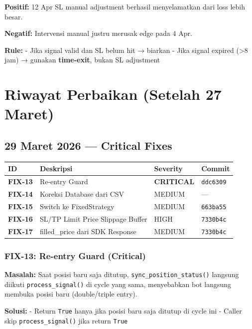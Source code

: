\documentclass[
  11pt,
  a4paper,
]{article}
\newcounter{none} %
\begin{document}
\textbf{Positif:} 12 Apr SL manual adjustment berhasil menyelamatkan
dari loss lebih besar.

\textbf{Negatif:} Intervensi manual justru merusak edge pada 4 Apr.

\textbf{Rule:} - Jika signal valid dan SL belum hit → biarkan - Jika
signal expired (\textgreater8 jam) → gunakan \textbf{time-exit}, bukan
SL adjustment

\section{Riwayat Perbaikan (Setelah 27
Maret)}\label{riwayat-perbaikan-setelah-27-maret}

\subsection{29 Maret 2026 --- Critical
Fixes}\label{maret-2026-critical-fixes}

{\def\LTcaptype{none} %
\begin{longtable}[]{@{}llll@{}}
\toprule\noalign{}
ID & Deskripsi & Severity & Commit \\
\midrule\noalign{}
\endhead
\bottomrule\noalign{}
\endlastfoot
\textbf{FIX-13} & Re-entry Guard & \textbf{CRITICAL} &
\texttt{ddc6309} \\
\textbf{FIX-14} & Koreksi Database dari CSV & MEDIUM & --- \\
\textbf{FIX-15} & Switch ke FixedStrategy & MEDIUM & \texttt{663ba55} \\
\textbf{FIX-16} & SL/TP Limit Price Slippage Buffer & HIGH &
\texttt{7330b4c} \\
\textbf{FIX-17} & filled\_price dari SDK Response & MEDIUM &
\texttt{7330b4c} \\
\end{longtable}
}

\subsubsection{FIX-13: Re-entry Guard
(Critical)}\label{fix-13-re-entry-guard-critical}

\textbf{Masalah:} Saat posisi baru saja ditutup,
\texttt{sync\_position\_status()} langsung diikuti
\texttt{process\_signal()} di cycle yang sama, menyebabkan bot langsung
membuka posisi baru (double/triple entry).

\textbf{Solusi:} - Return \texttt{True} hanya jika posisi baru saja
ditutup di cycle ini - Caller skip \texttt{process\_signal()} jika
return \texttt{True}
\end{document}
